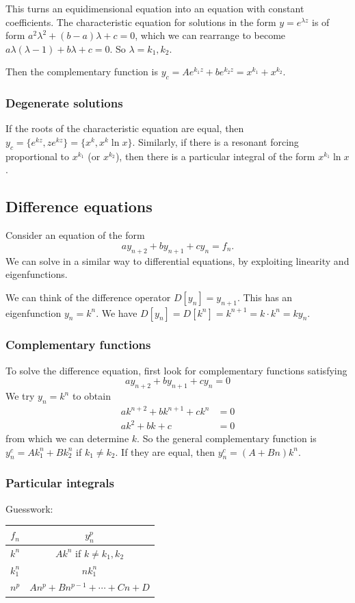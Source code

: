 \documentclass[a4paper]{article}
\begin{document}
This turns an equidimensional equation into an equation with constant coefficients. The characteristic equation for solutions in the form $y = e^{\lambda z}$ is of form $a^2\lambda^2 + (b - a)\lambda + c = 0$, which we can rearrange to become $a\lambda(\lambda - 1) + b\lambda + c = 0$. So $\lambda = k_1, k_2$.

Then the complementary function is $y_c = Ae^{k_1z} + be^{k_2z} = x^{k_1} + x^{k_2}$.

\subsubsection{Degenerate solutions}
If the roots of the characteristic equation are equal, then $y_c = \{e^{kz}, ze^{kz}\} = \{x^k, x^k\ln x\}$. Similarly, if there is a resonant forcing proportional to $x^{k_1}$ (or $x^{k_2}$), then there is a particular integral of the form $x^{k_1}\ln x$.

\subsection{Difference equations}
Consider an equation of the form
\[
a y_{n + 2} + by_{n + 1} + cy_n = f_n.
\]
We can solve in a similar way to differential equations, by exploiting linearity and eigenfunctions.

We can think of the difference operator $D[y_n] = y_{n + 1}$. This has an eigenfunction $y_n = k^n$. We have $D[y_n] = D[k^n] = k^{n + 1} = k\cdot k^n = ky_n$.

\subsubsection{Complementary functions}
To solve the difference equation, first look for complementary functions satisfying
\[
ay_{n + 2} + by_{n + 1} + cy_n = 0
\]
We try $y_n = k^n$ to obtain
\begin{align*}
  ak^{n + 2} + bk^{n + 1} + ck^n &= 0\\
  ak^2 + bk + c &= 0
\end{align*}
from which we can determine $k$. So the general complementary function is $y_n^c = Ak_1^n + Bk_2^n$ if $k_1 \not= k_2$. If they are equal, then $y_n^c = (A + Bn)k^n$.
\subsubsection{Particular integrals}
Guesswork:

\vspace{4pt}
\noindent\begin{tabular}{cc}
\toprule
$f_n$ & $y_n^p$\\
\midrule
$k^n$ & $Ak^n$ if $k \not= k_1, k_2$\\
$k_1^n$ & $nk_1^n$\\
$n^p$ & $An^p + Bn^{p - 1} + \cdots + Cn + D$\\
\bottomrule
\end{tabular}
\end{document}

